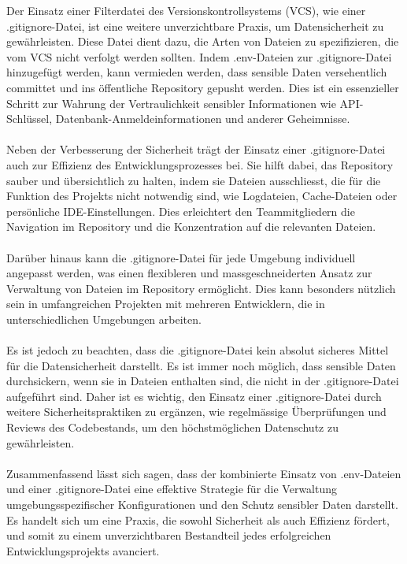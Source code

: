 Der Einsatz einer Filterdatei des Versionskontrollsystems (VCS), wie einer .gitignore-Datei, ist eine weitere unverzichtbare Praxis, um Datensicherheit zu gewährleisten. Diese Datei dient dazu, die Arten von Dateien zu spezifizieren, die vom VCS nicht verfolgt werden sollten. Indem .env-Dateien zur .gitignore-Datei hinzugefügt werden, kann vermieden werden, dass sensible Daten versehentlich committet und ins öffentliche Repository gepusht werden. Dies ist ein essenzieller Schritt zur Wahrung der Vertraulichkeit sensibler Informationen wie API-Schlüssel, Datenbank-Anmeldeinformationen und anderer Geheimnisse.\\\\
Neben der Verbesserung der Sicherheit trägt der Einsatz einer .gitignore-Datei auch zur Effizienz des Entwicklungsprozesses bei. Sie hilft dabei, das Repository sauber und übersichtlich zu halten, indem sie Dateien ausschliesst, die für die Funktion des Projekts nicht notwendig sind, wie Logdateien, Cache-Dateien oder persönliche IDE-Einstellungen. Dies erleichtert den Teammitgliedern die Navigation im Repository und die Konzentration auf die relevanten Dateien.\\\\
Darüber hinaus kann die .gitignore-Datei für jede Umgebung individuell angepasst werden, was einen flexibleren und massgeschneiderten Ansatz zur Verwaltung von Dateien im Repository ermöglicht. Dies kann besonders nützlich sein in umfangreichen Projekten mit mehreren Entwicklern, die in unterschiedlichen Umgebungen arbeiten.\\\\
Es ist jedoch zu beachten, dass die .gitignore-Datei kein absolut sicheres Mittel für die Datensicherheit darstellt. Es ist immer noch möglich, dass sensible Daten durchsickern, wenn sie in Dateien enthalten sind, die nicht in der .gitignore-Datei aufgeführt sind. Daher ist es wichtig, den Einsatz einer .gitignore-Datei durch weitere Sicherheitspraktiken zu ergänzen, wie regelmässige Überprüfungen und Reviews des Codebestands, um den höchstmöglichen Datenschutz zu gewährleisten.\\\\
Zusammenfassend lässt sich sagen, dass der kombinierte Einsatz von .env-Dateien und einer .gitignore-Datei eine effektive Strategie für die Verwaltung umgebungsspezifischer Konfigurationen und den Schutz sensibler Daten darstellt. Es handelt sich um eine Praxis, die sowohl Sicherheit als auch Effizienz fördert, und somit zu einem unverzichtbaren Bestandteil jedes erfolgreichen Entwicklungsprojekts avanciert.
